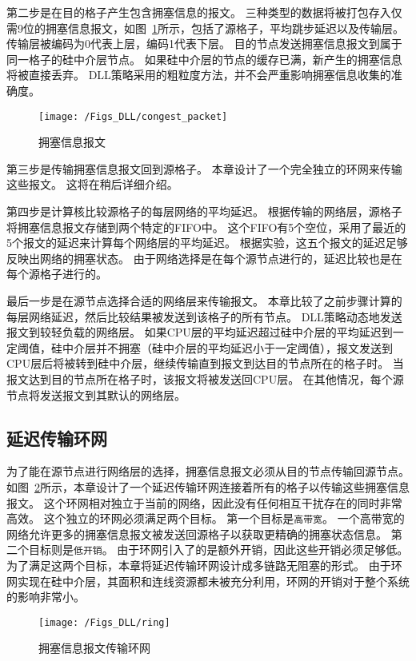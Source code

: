 第二步是在目的格子产生包含拥塞信息的报文。
三种类型的数据将被打包存入仅需9位的拥塞信息报文，如图~\ref{fig:congest_packet}所示，包括了源格子，平均跳步延迟以及传输层。
传输层被编码为0代表上层，编码1代表下层。
目的节点发送拥塞信息报文到属于同一格子的硅中介层节点。
如果硅中介层的节点的缓存已满，新产生的拥塞信息将被直接丢弃。
DLL策略采用的粗粒度方法，并不会严重影响拥塞信息收集的准确度。

\begin{figure}[htbp] %
  \centering
  \texttt{[image: /Figs\_DLL/congest\_packet]}
  \caption{拥塞信息报文}
  \label{fig:congest_packet}
\end{figure}


第三步是传输拥塞信息报文回到源格子。
本章设计了一个完全独立的环网来传输这些报文。
这将在稍后详细介绍。

第四步是计算核比较源格子的每层网络的平均延迟。
根据传输的网络层，源格子将拥塞信息报文存储到两个特定的FIFO中。
这个FIFO有5个空位，采用了最近的5个报文的延迟来计算每个网络层的平均延迟。
根据实验，这五个报文的延迟足够反映出网络的拥塞状态。
由于网络选择是在每个源节点进行的，延迟比较也是在每个源格子进行的。

最后一步是在源节点选择合适的网络层来传输报文。
本章比较了之前步骤计算的每层网络延迟，然后比较结果被发送到该格子的所有节点。
DLL策略动态地发送报文到较轻负载的网络层。
如果CPU层的平均延迟超过硅中介层的平均延迟到一定阈值，硅中介层并不拥塞（硅中介层的平均延迟小于一定阈值），报文发送到CPU层后将被转到硅中介层，继续传输直到报文到达目的节点所在的格子时。
当报文达到目的节点所在格子时，该报文将被发送回CPU层。
在其他情况，每个源节点将发送报文到其默认的网络层。


\subsection{延迟传输环网}
为了能在源节点进行网络层的选择，拥塞信息报文必须从目的节点传输回源节点。
如图~\ref{fig:ring}所示，本章设计了一个延迟传输环网连接着所有的格子以传输这些拥塞信息报文。
这个环网相对独立于当前的网络，因此没有任何相互干扰存在的同时非常高效。
这个独立的环网必须满足两个目标。
第一个目标是\texttt{高带宽}。
一个高带宽的网络允许更多的拥塞信息报文被发送回源格子以获取更精确的拥塞状态信息。
第二个目标则是\texttt{低开销}。
由于环网引入了的是额外开销，因此这些开销必须足够低。
为了满足这两个目标，本章将延迟传输环网设计成多链路无阻塞的形式。
由于环网实现在硅中介层，其面积和连线资源都未被充分利用，环网的开销对于整个系统的影响非常小。

\begin{figure}[htbp] %
  \centering
  \texttt{[image: /Figs\_DLL/ring]}
  \caption{拥塞信息报文传输环网}
  \label{fig:ring}
\end{figure}

